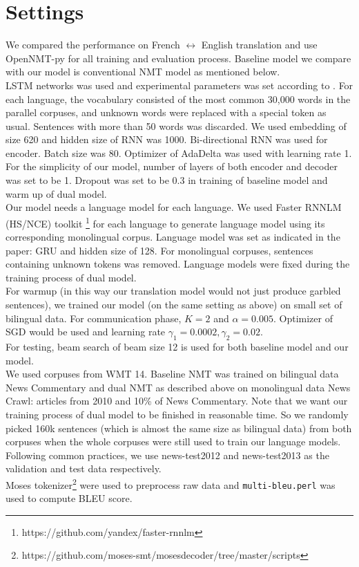 \documentclass[11pt]{article}
\begin{document}
{\part{Settings}
We compared the performance on French $\leftrightarrow$ English translation and use OpenNMT-py for all training and evaluation process. Baseline model we compare with our model is conventional NMT model as mentioned below.
\\
\newline
\indent LSTM networks was used and experimental parameters was set according to \cite{bahdanau2014neural}. For each language, the vocabulary consisted of the most common 30,000 words in the parallel corpuses, and unknown words were replaced with a special token as usual.  Sentences with more than 50 words was discarded. We used embedding of size 620 and hidden size of RNN was 1000. Bi-directional RNN was used for encoder. Batch size was 80. Optimizer of AdaDelta was used with learning rate 1. For the simplicity of our model, number of layers of both encoder and decoder was set to be 1. Dropout was set to be 0.3 in training of baseline model and warm up of dual model.
\\
\newline
\indent Our model needs a language model for each language. We used Faster RNNLM (HS/NCE) toolkit \footnote{https://github.com/yandex/faster-rnnlm}\cite{mikolov2010recurrent} for each language to generate language model using its corresponding monolingual corpus. Language model was set as indicated in the paper: GRU and hidden size of 128. For monolingual corpuses, sentences containing unknown tokens was removed. Language models were fixed during the training process of dual model.
\\
\newline
\indent For warmup (in this way our translation model would not just produce garbled sentences), we trained our model (on the same setting as above) on small set of bilingual data. For communication phase, $K=2$ and $\alpha = 0.005$. Optimizer of SGD would be used and learning rate $\gamma_1 = 0.0002, \gamma_2=0.02$.
\\
\newline
\indent For testing, beam search of beam size 12 is used for both baseline model and our model.
\\
\newline
\indent We used corpuses from WMT 14. Baseline NMT was trained on bilingual data News Commentary and dual NMT as described above on monolingual data News Crawl: articles from 2010 and 10\% of News Commentary. Note that we want our training process of dual model to be finished in reasonable time. So we randomly picked 160k sentences (which is almost the same size as bilingual data) from both corpuses when the whole corpuses were still used to train our language models. Following common practices, we use news-test2012 and news-test2013 as the validation and test data respectively.
\\
\newline
\indent Moses tokenizer\footnote{https://github.com/moses-smt/mosesdecoder/tree/master/scripts} were used to preprocess raw data and \texttt{multi-bleu.perl} was used to compute BLEU score.

}
\end{document}

